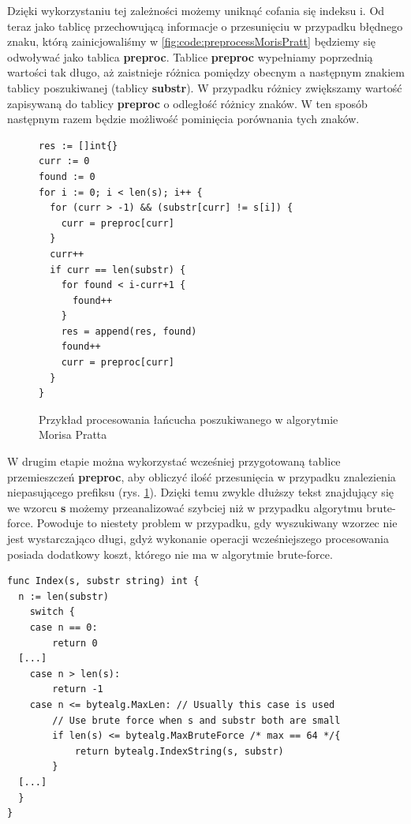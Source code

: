 Dzięki wykorzystaniu tej zależności możemy uniknąć cofania się indeksu i. 
Od teraz jako tablicę przechowującą informacje o przesunięciu w przypadku 
błędnego znaku, którą zainicjowaliśmy w \ref{fig:code:preprocessMorisPratt}
będziemy się odwoływać jako tablica \textbf{preproc}.
Tablice \textbf{preproc} wypełniamy poprzednią wartości tak długo, aż zaistnieje różnica 
pomiędzy obecnym a następnym znakiem tablicy poszukiwanej (tablicy \textbf{substr}). W przypadku różnicy 
zwiększamy wartość zapisywaną do tablicy \textbf{preproc} o odległość różnicy znaków.
W ten sposób następnym razem będzie możliwość pominięcia porównania tych znaków.

\begin{figure}[h]
  \centering
  \begin{lstlisting}
res := []int{}
curr := 0
found := 0
for i := 0; i < len(s); i++ {
  for (curr > -1) && (substr[curr] != s[i]) {
    curr = preproc[curr]
  }
  curr++
  if curr == len(substr) {
    for found < i-curr+1 {
      found++
    }
    res = append(res, found)
    found++
    curr = preproc[curr]
  }
}
  \end{lstlisting}
  \caption{Przykład procesowania łańcucha poszukiwanego w algorytmie Morisa Pratta}
  \label{fig:code:algoMorisPratt}
\end{figure}

W drugim etapie można wykorzystać wcześniej przygotowaną tablice przemieszczeń 
\textbf{preproc}, aby obliczyć ilość przesunięcia w przypadku znalezienia 
niepasującego prefiksu (rys. \ref{fig:code:algoMorisPratt}). Dzięki temu zwykle 
dłuższy tekst znajdujący się we wzorcu \textbf{s} możemy przeanalizować szybciej
niż w przypadku algorytmu brute-force. Powoduje to niestety problem w przypadku,
gdy wyszukiwany wzorzec nie jest wystarczająco długi, gdyż wykonanie operacji 
wcześniejszego procesowania posiada dodatkowy koszt, którego nie ma w algorytmie brute-force.

\vspace{-3cm} 
\begin{lstlisting}[basicstyle=\small]
func Index(s, substr string) int {
  n := len(substr)
	switch {
	case n == 0:
		return 0
  [...]
	case n > len(s):
		return -1
	case n <= bytealg.MaxLen: // Usually this case is used
		// Use brute force when s and substr both are small
		if len(s) <= bytealg.MaxBruteForce /* max == 64 */{
			return bytealg.IndexString(s, substr)
		}
  [...]
  }
}
\end{lstlisting}
\vspace{-.1cm} 

